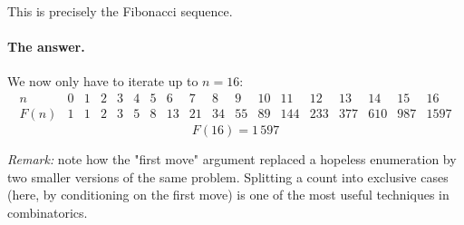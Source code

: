 \documentclass[]{article}
\begin{document}
	This is precisely the Fibonacci sequence.

	\paragraph{The answer.}
	We now only have to iterate up to $n = 16$:
	$$
	\begin{array}{c|ccccccccccccccccc}
		n & 0 & 1 & 2 & 3 & 4 & 5 & 6 & 7 & 8 & 9 & 10 & 11 & 12 & 13 & 14 & 15 & 16 \\
		\hline
		F(n) & 1 & 1 & 2 & 3 & 5 & 8 & 13 & 21 & 34 & 55 & 89 & 144 & 233 & 377 & 610 & 987 & 1597
	\end{array}
	$$
	$$
	F(16) = \boxed{1\,597}
	$$

	\textit{Remark:} note how the "first move" argument replaced a hopeless enumeration by two smaller versions of the same problem.
	Splitting a count into exclusive cases (here, by conditioning on the first move) is one of the most useful techniques in combinatorics.
\end{document}
